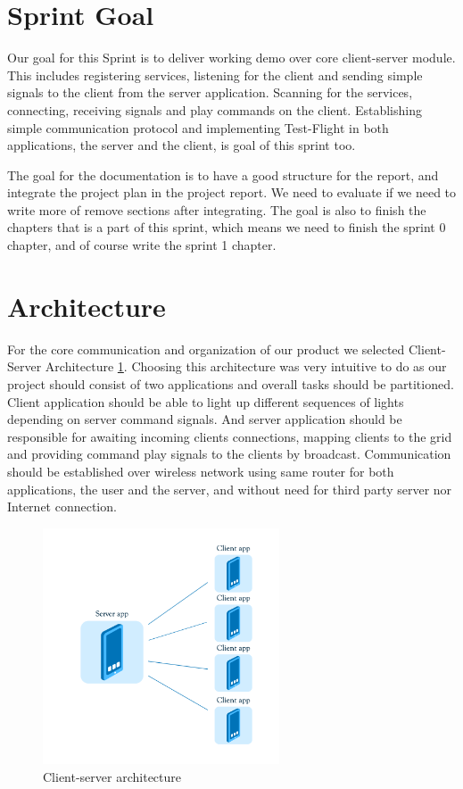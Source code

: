 
\section{Sprint Goal}

Our goal for this Sprint is to deliver working demo over core client-server module.
This includes registering services, listening for the client and sending simple signals to the client from the server application.
Scanning for the services, connecting, receiving signals and play commands on the client.
Establishing simple communication protocol and implementing Test-Flight in both applications, the server and the client, is goal of this sprint too.

The goal for the documentation is to have a good structure for the report, and integrate the project plan in the project report. We need to evaluate if we need to write more of remove sections after integrating. The goal is also to finish the chapters that is a part of this sprint, which means we need to finish the sprint 0 chapter, and of course write the sprint 1 chapter.

\section{Architecture}
For the core communication and organization of our product we selected Client-Server Architecture \ref{fig:sprint1_arhitecture}.
Choosing this architecture was very intuitive to do as our project should consist of two applications and overall tasks should be partitioned. 
Client application should be able to light up different sequences of lights depending on server command signals.
And server application should be responsible for awaiting incoming clients connections, mapping clients to the grid and providing command play signals to the clients by broadcast.
Communication should be established over wireless network using same router for both applications, the user and the server, and without need for third party server nor Internet connection. 

\begin{figure}[H]
	\centering
		\includegraphics[width=7cm]{sprint1/arhitecture.png}
	\caption{Client-server architecture}
	\label{fig:sprint1_arhitecture}
\end{figure}

